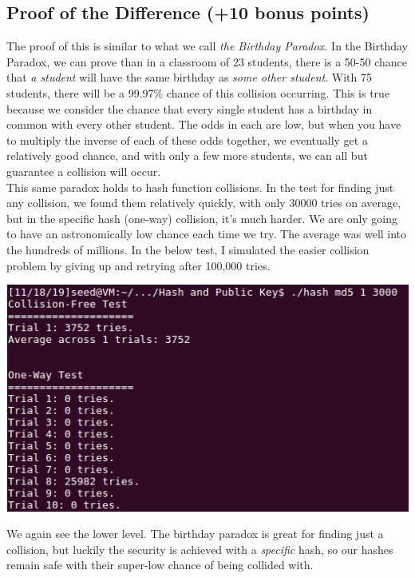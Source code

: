\documentclass{article}
\begin{document}
\subsection{Proof of the Difference (+10 bonus points)}
The proof of this is similar to what we call \textit{the Birthday Paradox.} In the Birthday Paradox, we can prove than in a classroom of 23 students, there is a 50-50 chance that \textit{a student} will have the same birthday as \textit{some other student}.  With 75 students, there will be a 99.97\% chance of this collision occurring.  This is true because we consider the chance that every single student has a birthday in common with every other student.  The odds in each are low, but when you have to multiply the inverse of each of these odds together, we eventually get a relatively good chance, and with only a few more students, we can all but guarantee a collision will occur.\\

This same paradox holds to hash function collisions.  In the test for finding just any collision, we found them relatively quickly, with only 30000 tries on average, but in the specific hash (one-way) collision, it's much harder.  We are only going to have an astronomically low chance each time we try.  The average was well into the hundreds of millions.  In the below test, I simulated the easier collision problem by giving up and retrying after 100,000 tries.
\begin{center}
    \includegraphics[scale=0.5]{task4_one_way.png}
\end{center}

We again see the lower level.  The birthday paradox is great for finding just a collision, but luckily the security is achieved with a \textit{specific} hash, so our hashes remain safe with their super-low chance of being collided with.
\end{document}
